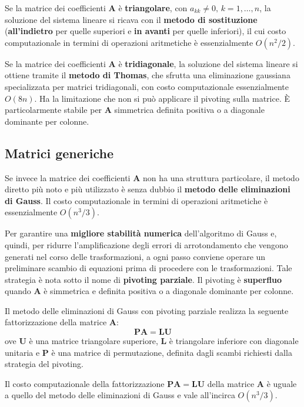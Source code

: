 Se la matrice dei coefficienti $\mathbf{A}$ è \textbf{triangolare}, con $a_{kk}\ne0,\,k=
1,\dots,n$, la soluzione del sistema lineare si ricava con il \textbf{metodo di sostituzione}
(\textbf{all'indietro} per quelle superiori e \textbf{in avanti} per quelle inferiori), il cui costo
computazionale in termini di operazioni aritmetiche è essenzialmente $O(n^2/2)$.

Se la matrice dei coefficienti $\mathbf{A}$ è \textbf{tridiagonale}, la soluzione del sistema lineare
si ottiene tramite il \textbf{metodo di Thomas}, che sfrutta una eliminazione gaussiana specializzata
per matrici tridiagonali, con costo computazionale essenzialmente $O(8n)$. Ha la limitazione che non
si può applicare il pivoting sulla matrice. È particolarmente stabile per $\mathbf{A}$ simmetrica definita
positiva o a diagonale dominante per colonne.

\subsection{Matrici generiche}

Se invece la matrice dei coefficienti $\mathbf{A}$ non ha una struttura particolare, il metodo diretto
più noto e più utilizzato è senza dubbio il \textbf{metodo delle eliminazioni di Gauss}. Il costo
computazionale in termini di operazioni aritmetiche è essenzialmente $O(n^3/3)$.

Per garantire una \textbf{migliore stabilità numerica} dell'algoritmo di Gauss e, quindi, per ridurre
l'amplificazione degli errori di arrotondamento che vengono generati nel corso delle trasformazioni,
a ogni passo conviene operare un preliminare scambio di equazioni prima di procedere con le
trasformazioni. Tale strategia è nota sotto il nome di \textbf{pivoting parziale}. Il pivoting è
\textbf{superfluo} quando $\mathbf{A}$ è simmetrica e definita positiva o a diagonale dominante per colonne.

Il metodo delle eliminazioni di Gauss con pivoting parziale realizza la seguente fattorizzazione della
matrice $\mathbf{A}$:
\[\mathbf{PA}=\mathbf{LU}\]
ove $\mathbf{U}$ è una matrice triangolare superiore, $\mathbf{L}$ è triangolare inferiore con
diagonale unitaria e $\mathbf{P}$ è una matrice di permutazione, definita dagli scambi richiesti
dalla strategia del pivoting.

Il costo computazionale della fattorizzazione $\mathbf{PA}=\mathbf{LU}$ della matrice $\mathbf{A}$
è uguale a quello del metodo delle eliminazioni di Gauss e vale all'incirca $O(n^3/3)$.


